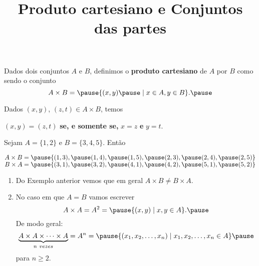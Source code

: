 \documentclass{beamer}
\title{Produto cartesiano e Conjuntos das partes}
\author[\autor]{\autor}
\institute[\instituto]{\instituto}
\date{}
\begin{document}
    \begin{frame}
        \maketitle
    \end{frame}


    \begin{frame}
        \begin{definicao}
        Dados dois conjuntos $A$ e $B$, \pause definimos o \textbf{produto cartesiano} \pause de $A$ por $B$ como sendo o conjunto\pause
        \[
            A \times B = \pause \{(x,y) \pause \mid x\in A, y\in B\}.\pause
        \]
        \end{definicao}

        Dados $(x,y)$, \pause $(z,t) \in A\times B$, \pause temos
        \begin{center}
            $(x,y) = (z,t)$ \pause \textbf{se, e somente se,} $x = z$ \pause \textbf{e} $y = t$.\pause
        \end{center}

        \begin{exemplo}\label{exemplo_produto_cartesiano}
            Sejam $A = \{1, 2\}$ \pause e $B = \{3, 4, 5\}$. \pause Ent\~ao\pause
            \begin{center}
                $A \times B = \pause \{(1,3), \pause (1,4), \pause  (1,5), \pause (2,3), \pause (2,4), \pause (2,5)\}$\pause\\
                $B \times A = \pause \{(3,1), \pause (3,2), \pause (4,1), \pause (4,2), \pause (5,1), \pause (5,2)\}$\pause
        \end{center}
        \end{exemplo}
    \end{frame}

    \begin{frame}
        \begin{observacoes}
            \begin{enumerate}[label={\arabic*})]
                \item Do Exemplo anterior \pause vemos que em geral $A \times B \neq B\times A$.\pause
                \item No caso em que $A = B$ \pause vamos escrever\pause
                \[
                    A \times A = A^2 = \pause \{ (x, y) \mid x, y \in A\}.\pause
                \]
                De modo geral:\pause
                \[
                    \underbrace{A \times A \times \cdots \times A}_{n\ vezes} = A^n = \pause \{ (x_1, x_2, \dots, x_n) \mid x_1, x_2, \dots, x_n \in A\}\pause
                \]
                para $n \ge 2$.
            \end{enumerate}
        \end{observacoes}
    \end{frame}
\end{document}
